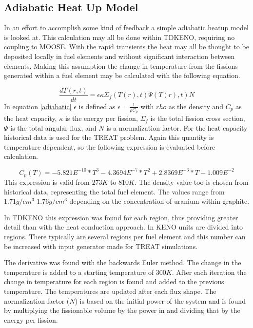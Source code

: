 \documentclass[11pt]{article}
\begin{document}
\subsection{Adiabatic Heat Up Model}

In an effort to accomplish some kind of feedback a simple adiabatic heatup model is looked at.  This calculation may all be done within TDKENO, requiring no coupling to MOOSE.  With the rapid transients the heat may all be thought to be deposited locally in fuel elements and without significant interaction between elements.  Making this assumption the change in temperature from the fissions generated within a fuel element may be calculated with the following equation.

\begin{equation}
    \frac{dT(r,t)}{dt} = \epsilon \kappa \Sigma_f(T(r),t) \Psi(T(r),t) N
    \label{adiabatic}
\end{equation}
In equation \ref{adiabatic} $\epsilon$ is defined as $\epsilon = \frac{1}{\rho C_p}$ with $rho$ as the density and $C_p$ as the heat capacity, $\kappa$ is the energy per fission, $\Sigma_f$ is the total fission cross section, $\Psi$ is the total angular flux, and $N$ is a normalization factor. For the heat capacity historical data is used for the TREAT problem.  Again this quantity is temperature dependent, so the following expression is evaluated before calculation.

\begin{equation}
    C_p(T) = -5.821E^{-10}*T^3 - 4.3694E^{-7}*T^2 + 2.8369E^{-3}*T - 1.009E^{-2}
\end{equation}
This expression is valid from $273K$ to $810K$. The density value too is chosen from historical data, representing the total fuel element.   The values range from $1.71 g/cm^3$ $1.76g/cm^3$ depending on the concentration of uranium within graphite. 

In TDKENO this expression was found for each region, thus providing greater detail than with the heat conduction approach.  In KENO units are divided into regions.  There typically are several regions per fuel element and this number can be increased with input generator made for TREAT simulations.  

The derivative was found with the backwards Euler method. The change in the temperature is added to a starting temperature of $300K$.  After each iteration the change in temperature for each region is found and added to the previous temperature. The temperatures are updated after each flux shape. The normalization factor ($N$) is based on the initial power of the system and is found by multiplying the fissionable volume by the power in and dividing that by the energy per fission. 
\end{document}
